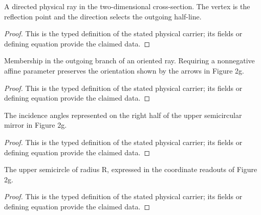 \begin{definition}
  \label{def:physics:IPhO_2026_2_C_3:aux007}
  A directed physical ray in the two-dimensional cross-section. The vertex is the reflection point and the direction selects the outgoing half-line.
\end{definition}
\begin{proof}
  This is the typed definition of the stated physical carrier; its fields or defining equation provide the claimed data.
\end{proof}

\begin{definition}
  \label{def:physics:IPhO_2026_2_C_3:aux008}
  Membership in the outgoing branch of an oriented ray. Requiring a nonnegative affine parameter preserves the orientation shown by the arrows in Figure 2g.
\end{definition}
\begin{proof}
  This is the typed definition of the stated physical carrier; its fields or defining equation provide the claimed data.
\end{proof}

\begin{definition}
  \label{def:physics:IPhO_2026_2_C_3:aux009}
  The incidence angles represented on the right half of the upper semicircular mirror in Figure 2g.
\end{definition}
\begin{proof}
  This is the typed definition of the stated physical carrier; its fields or defining equation provide the claimed data.
\end{proof}

\begin{definition}
  \label{def:physics:IPhO_2026_2_C_3:aux010}
  The upper semicircle of radius R, expressed in the coordinate readouts of Figure 2g.
\end{definition}
\begin{proof}
  This is the typed definition of the stated physical carrier; its fields or defining equation provide the claimed data.
\end{proof}

